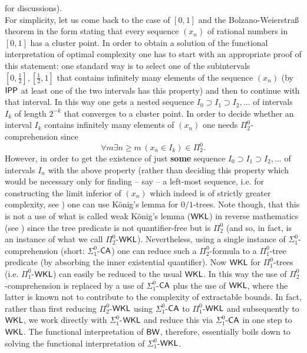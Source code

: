\cite{Kohlenbach(weakcompactness)} for discussions).  
\\[1mm] For simplicity, let us come back to the case of $[0,1]$ and the 
Bolzano-Weierstra\ss{} theorem in the form stating that every sequence 
$(x_n)$ of rational numbers 
in $[0,1]$ has a cluster point. In order to obtain a solution of the 
functional interpretation of optimal complexity one has to start with an 
appropriate proof of this statement: one standard way is to select one of 
the subintervals $[0,\frac{1}{2}],[\frac{1}{2},1]$ that contains infinitely 
many elements of the sequence $(x_n)$ (by $\textsf{\upshape IPP}$ at least one of the two 
intervals has this property) and then to continue with that interval. In 
this way one gets a nested sequence $I_0\supset I_1\supset I_2,\ldots$ 
of intervals $I_k$ of length $2^{-k}$ that converges to a cluster point. 
In order to decide whether an interval $I_k$ contains infinitely 
many elements of $(x_n)$ one needs $\Pi^0_2$-comprehension since 
\[ \forall m\exists n\ge m\, (x_n\in I_k) \in\Pi^0_2. \]
However, in order to get the existence of just {\bf some} 
sequence $I_0\supset I_1\supset I_2,\ldots$ 
of intervals $I_n$ with the above property (rather than deciding 
this property which would be necessary only for finding -- say -- 
a left-most sequence, i.e. for constructing the limit inferior of $(x_n)$ 
which indeed is of strictly greater complexity, see \cite{Kohlenbach00}) 
one can use K\"onig's lemma for 
$0/1$-trees. Note though, that 
this is not a use of what is called weak K\"onig's 
lemma ($\textsf{\upshape WKL}$) in reverse mathematics (see \cite{Simpson99}) since the tree 
predicate is not quantifier-free but is $\Pi^0_2$ (and so, in fact, is 
an instance of what we call $\Pi^0_2$-$\textsf{\upshape WKL}$). Nevertheless, using 
a single instance of $\Sigma^0_1$-comprehension (short: $\Sigma^0_1$-$\textsf{\upshape CA}$) 
one can reduce such a 
$\Pi^0_2$-formula to a $\Pi^0_1$-tree predicate (by absorbing the inner 
existential quantifier). Now $\textsf{\upshape WKL}$ for $\Pi^0_1$-trees (i.e. 
$\Pi^0_1$-$\textsf{\upshape WKL}$) 
can easily be reduced to 
the usual $\textsf{\upshape WKL}$. In this way the use of $\Pi^0_2$-comprehension is replaced 
by a use of $\Sigma^0_1$-$\textsf{\upshape CA}$ plus the use of $\textsf{\upshape WKL}$, where the latter is 
known not to contribute to the complexity of extractable bounds. In fact, 
rather than first reducing $\Pi^0_2$-$\textsf{\upshape WKL}$ using $\Sigma^0_1$-$\textsf{\upshape CA}$ to 
$\Pi^0_1$-$\textsf{\upshape WKL}$ and subsequently to $\textsf{\upshape WKL}$, we work directly with 
$\Sigma^0_1$-$\textsf{\upshape WKL}$ 
and reduce this via $\Sigma^0_1$-$\textsf{\upshape CA}$ in one step to $\textsf{\upshape WKL}$. The functional 
interpretation of $\textsf{\upshape BW}$, therefore, essentially boils down to solving the 
functional interpretation of $\Sigma^0_1$-$\textsf{\upshape WKL}$.  


